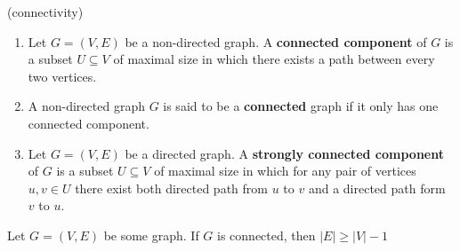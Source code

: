 \begin{definition} (connectivity)
\begin{enumerate}
  \item Let $ G =\left( V,E \right)$ be a non-directed graph. A \textbf{connected component} of $G$ is a subset $U \subseteq V$ of maximal size in which there exists a path between every two vertices. 
\item A non-directed graph $G$ is said to be a \textbf{connected} graph if it only has one connected component.
\item Let $ G = \left(V, E\right)$ be a directed graph. A \textbf{strongly connected component} of $G$ is a subset $U \subseteq V$ of maximal size in which for any pair of vertices $u,v \in U$ there exist both directed path from $u$ to $v$ and a directed path form $v$ to $u$.   
\end{enumerate}
\end{definition}
%

\begin{claim}
Let $G=(V,E)$ be some graph. If $G$ is connected, then $|E| \geq |V|-1$
\end{claim}

